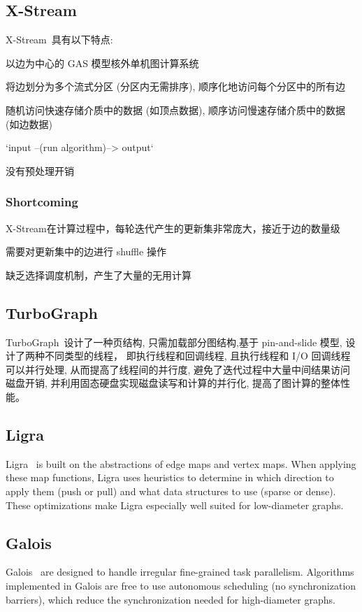 \documentclass[UTF8,12pt,a4paper]{article}
\begin{document}
\subsection{X-Stream}
X-Stream~\cite{DBLP:conf/sosp/RoyMZ13}具有以下特点:
\begin{compactitem}
  \item 以边为中心的 GAS 模型核外单机图计算系统
  \item 将边划分为多个流式分区 (分区内无需排序), 顺序化地访问每个分区中的所有边
  \item 随机访问快速存储介质中的数据 (如顶点数据), 顺序访问慢速存储介质中的数据 (如边数据)
  \item `input --(run algorithm)--> output`
  \item 没有预处理开销
\end{compactitem}
\subsubsection{Shortcoming}
\begin{compactitem}
  \item X-Stream在计算过程中，每轮迭代产生的更新集非常庞大，接近于边的数量级
  \item 需要对更新集中的边进行 shuffle 操作
  \item 缺乏选择调度机制，产生了大量的无用计算
\end{compactitem}

\subsection{TurboGraph}
TurboGraph~\cite{DBLP:conf/kdd/HanLPL0KY13}设计了一种页结构,
只需加载部分图结构,基于 pin-and-slide 模型, 设计了两种不同类型的线程，
即执行线程和回调线程, 且执行线程和 I/O 回调线程可以并行处理,
从而提高了线程间的并行度, 避免了迭代过程中大量中间结果访问磁盘开销,
并利用固态硬盘实现磁盘读写和计算的并行化, 提高了图计算的整体性能。

\subsection{Ligra}
Ligra~\cite{DBLP:conf/ppopp/ShunB13} is built on
the abstractions of edge maps and vertex maps.
When applying these map functions,
Ligra uses heuristics to determine in
which direction to apply them (push or pull)
and what data structures to use (sparse or dense).
These optimizations make Ligra especially well suited for low-diameter graphs.

\subsection{Galois}
Galois~\cite{DBLP:conf/sosp/NguyenLP13}
are designed to handle irregular fine-grained task parallelism.
Algorithms implemented in Galois
are free to use autonomous scheduling (no synchronization barriers),
which reduce the synchronization needed for high-diameter graphs.
\end{document}
